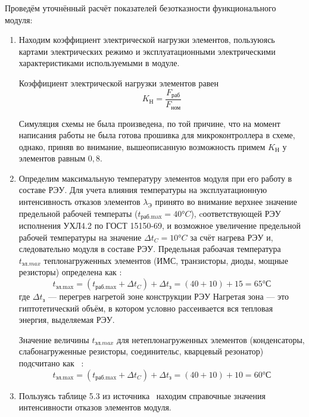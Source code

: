 Проведём уточнённый расчёт показателей безотказности функционального модуля:
\begin{enumerate}
\item Находим коэффициент электрической нагрузки элементов, пользуюясь
картами электрических режимо и эксплуатационными электрическими
характеристиками используемыми в модуле.

Коэффициент электрической нагрузки элементов равен
\begin{equation}
  K_{\text{Н}} = \frac{F_{\text{раб}}}{F_{\text{ном}}}
\end{equation}



Симуляция схемы не была произведена, по той причине, что на момент
написания работы не была готова прошивка для микроконтроллера в схеме,
однако, приняв во внимание,  вышеописанную возможность примем
$K_{\text{Н}}$ у элементов равным $0,8$.
\item Определим максимальную температуру элементов модуля при его
  работу в составе РЭУ.
  Для учета влияния температуры на эксплуатационную интенсивность
  отказов элементов  $\lambda_{\text{Э}}$ принято во внимание
  верхнее значение предельной рабочей температы
  ($t_{\text{раб.max}}= 40°C$), cоответствующей РЭУ
  исполнения УХЛ4.2 по ГОСТ 15150-69, и возможное увеличение предельной рабочей температуры на значение
  $\Delta t_C = 10°C$ за счёт нагрева РЭУ и, следовательно модуля в составе РЭУ.
  Предельная рабоачая температура $t_{эл.max}$ теплонагруженных
  элементов (ИМС, транзисторы, диоды, мощные резисторы) определена как \cite{Borovikov2010}:
  \begin{equation}
    t_{\text{эл.max}} = (t_{\text{раб.max}} + \Delta t_C) + \Delta t_{\text{з}} = (40 + 10) +15 = 65°С
  \end{equation}
  где $\Delta t_{\text{з}}$ — перегрев нагретой зоне конструкции РЭУ
  Нагретая зона — это гиптотетический объём, в котором условно
  рассеивается вся тепловая энергия, выделяемая РЭУ.

  Значение величины $t_{эл.max}$  для нетеплонагруженных элементов
  (конденсаторы, слабонагруженные резисторы, соединительс, кварцевый резонатор)
  подсчитано как ~\cite{Borovikov2010}:
  \begin{equation}
    t_{\text{эл.max}} = (t_{\text{раб.max}} + \Delta t_C) + \Delta t_{\text{з}} = (40 + 10) +10 = 60°С
  \end{equation}
%
\item Пользуясь таблице 5.3 из источника~\cite{Borovikov2010} находим
  справочные значения интенсивности отказов элементов модуля.


\end{enumerate}

